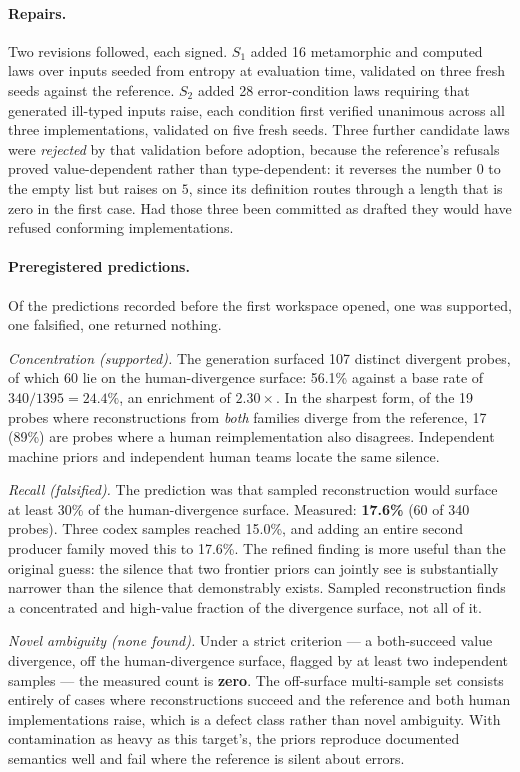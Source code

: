 \documentclass[10pt,twocolumn]{article}
\begin{document}
\paragraph{Repairs.} Two revisions followed, each signed. $S_1$ added 16
metamorphic and computed laws over inputs seeded from entropy at
evaluation time, validated on three fresh seeds against the reference.
$S_2$ added 28 error-condition laws requiring that generated ill-typed
inputs raise, each condition first verified unanimous across all three
implementations, validated on five fresh seeds. Three further candidate
laws were \emph{rejected} by that validation before adoption, because the
reference's refusals proved value-dependent rather than type-dependent:
it reverses the number $0$ to the empty list but raises on $5$, since its
definition routes through a length that is zero in the first case. Had
those three been committed as drafted they would have refused conforming
implementations.

\paragraph{Preregistered predictions.} Of the predictions recorded before
the first workspace opened, one was supported, one falsified, one
returned nothing.

\emph{Concentration (supported).} The generation surfaced 107 distinct
divergent probes, of which 60 lie on the human-divergence surface:
56.1\% against a base rate of $340/1395 = 24.4\%$, an enrichment of
$2.30\times$. In the sharpest form, of the 19 probes where
reconstructions from \emph{both} families diverge from the reference, 17
(89\%) are probes where a human reimplementation also disagrees.
Independent machine priors and independent human teams locate the same
silence.

\emph{Recall (falsified).} The prediction was that sampled
reconstruction would surface at least 30\% of the human-divergence
surface. Measured: \textbf{17.6\%} (60 of 340 probes). Three codex
samples reached 15.0\%, and adding an entire second producer family moved
this to 17.6\%. The refined finding is more useful than the original
guess: the silence that two frontier priors can jointly see is
substantially narrower than the silence that demonstrably exists.
Sampled reconstruction finds a concentrated and high-value fraction of
the divergence surface, not all of it.

\emph{Novel ambiguity (none found).} Under a strict criterion --- a
both-succeed value divergence, off the human-divergence surface, flagged
by at least two independent samples --- the measured count is
\textbf{zero}. The off-surface multi-sample set consists entirely of
cases where reconstructions succeed and the reference and both human
implementations raise, which is a defect class rather than novel
ambiguity. With contamination as heavy as this target's, the priors
reproduce documented semantics well and fail where the reference is
silent about errors.
\end{document}
